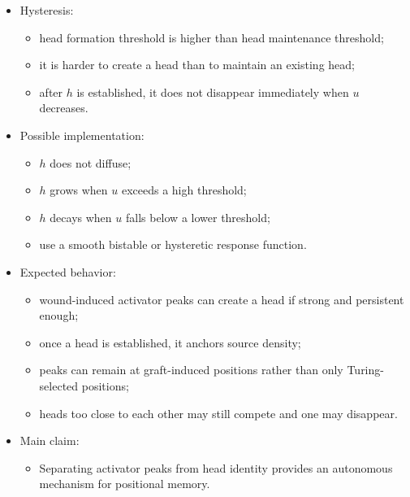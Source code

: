 \begin{itemize}
    \item Hysteresis:
    \begin{itemize}
        \item head formation threshold is higher than head maintenance threshold;
        \item it is harder to create a head than to maintain an existing head;
        \item after \(h\) is established, it does not disappear immediately when \(u\) decreases.
    \end{itemize}
    \item Possible implementation:
    \begin{itemize}
        \item \(h\) does not diffuse;
        \item \(h\) grows when \(u\) exceeds a high threshold;
        \item \(h\) decays when \(u\) falls below a lower threshold;
        \item use a smooth bistable or hysteretic response function.
    \end{itemize}
    \item Expected behavior:
    \begin{itemize}
        \item wound-induced activator peaks can create a head if strong and persistent enough;
        \item once a head is established, it anchors source density;
        \item peaks can remain at graft-induced positions rather than only Turing-selected positions;
        \item heads too close to each other may still compete and one may disappear.
    \end{itemize}
    \item Main claim:
    \begin{itemize}
        \item Separating activator peaks from head identity provides an autonomous mechanism for positional memory.
    \end{itemize}
\end{itemize}
